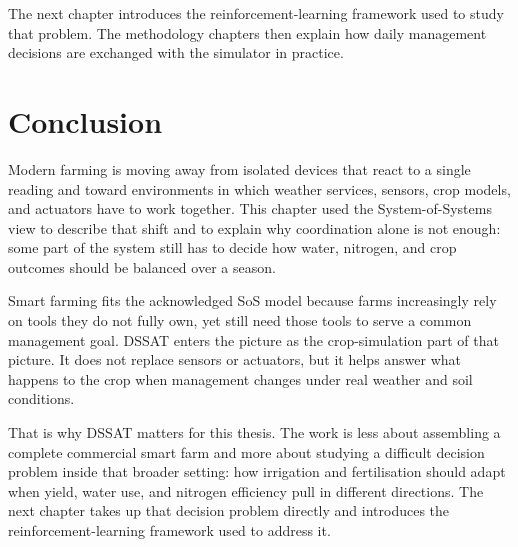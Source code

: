 The next chapter introduces the reinforcement-learning framework used to study
that problem. The methodology chapters then explain how daily management
decisions are exchanged with the simulator in practice.


\section{Conclusion}
\label{sec:ch1_conclusion}

Modern farming is moving away from isolated devices that react to a single
reading and toward environments in which weather services, sensors, crop models,
and actuators have to work together. This chapter used the System-of-Systems view
to describe that shift and to explain why coordination alone is not enough:
some part of the system still has to decide how water, nitrogen, and crop
outcomes should be balanced over a season.

Smart farming fits the acknowledged SoS model because farms increasingly rely on
tools they do not fully own, yet still need those tools to serve a common
management goal. DSSAT enters the picture as the crop-simulation part of that
picture. It does not replace sensors or actuators, but it helps answer what
happens to the crop when management changes under real weather and soil
conditions.

That is why DSSAT matters for this thesis. The work is less about assembling a
complete commercial smart farm and more about studying a difficult decision
problem inside that broader setting: how irrigation and fertilisation should
adapt when yield, water use, and nitrogen efficiency pull in different
directions. The next chapter takes up that decision problem directly and
introduces the reinforcement-learning framework used to address it.
